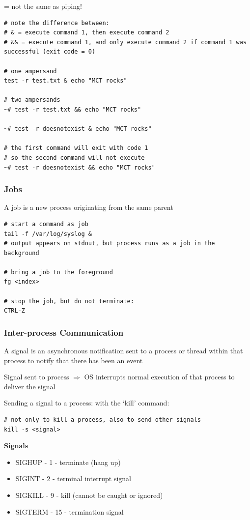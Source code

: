 \documentclass{article}
\begin{document}
= not the same as piping!

\begin{verbatim}
# note the difference between:
# & = execute command 1, then execute command 2
# && = execute command 1, and only execute command 2 if command 1 was successful (exit code = 0)

# one ampersand
test -r test.txt & echo "MCT rocks"

# two ampersands
~# test -r test.txt && echo "MCT rocks"

~# test -r doesnotexist & echo "MCT rocks"

# the first command will exit with code 1
# so the second command will not execute
~# test -r doesnotexist && echo "MCT rocks"
\end{verbatim}

\subsubsection{Jobs}

A job is a new process originating from the same parent

\begin{verbatim}
# start a command as job
tail -f /var/log/syslog &
# output appears on stdout, but process runs as a job in the background

# bring a job to the foreground
fg <index>

# stop the job, but do not terminate:
CTRL-Z
\end{verbatim}


\subsubsection{Inter-process Communication}

A signal is an asynchronous notification sent to a process or thread within that process
to notify that there has been an event

Signal sent to process $\Rightarrow$ OS interrupts normal execution of that process to deliver the signal

Sending a signal to a process: with the `kill' command:

\begin{verbatim}
# not only to kill a process, also to send other signals
kill -s <signal>
\end{verbatim}

\textbf{Signals}

\begin{itemize}
    \item SIGHUP - 1 - terminate (hang up)
    \item SIGINT - 2 - terminal interrupt signal
    \item SIGKILL - 9 - kill (cannot be caught or ignored)
    \item SIGTERM - 15 - termination signal
\end{itemize}
\end{document}
